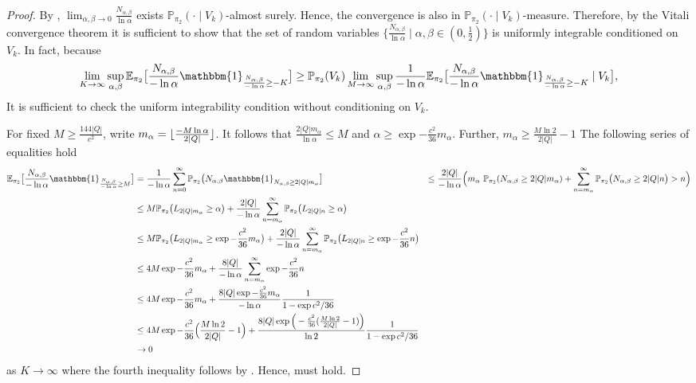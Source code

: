 \documentclass[a4paper,UKenglish,cleveref, autoref,mathscr]{lipics-v2019}
\newcommand{\EE}{\mathbb{E}}
\newcommand{\PP}{\mathbb{P}}
\newcommand{\1}{\mathbbm{1}}
\DeclarePairedDelimiter\floor{\lfloor}{\rfloor}
\begin{document}
\begin{proof}
By , $\lim_{\alpha, \beta \rightarrow 0} \frac{N_{\alpha, \beta}}{\ln \alpha}$ exists $\PP_{\pi_2}( \cdot \mid V_k)$-almost surely. Hence, the convergence is also in $\PP_{\pi_2}( \cdot \mid V_k)$-measure. Therefore, by the Vitali convergence theorem\cite{bog2007} it is sufficient to show that the set of random variables $\{ \frac{N_{\alpha, \beta}}{\ln \alpha} \mid \alpha, \beta \in (0,\frac12) \}$ is uniformly integrable conditioned on $V_k$. In fact, because
\begin{equation}\label{unifintcond}
\lim_{K \rightarrow \infty} \sup_{\alpha, \beta} \EE_{\pi_2} \big[ \frac{N_{\alpha, \beta}}{- \ln \alpha}\1_{\frac{N_{\alpha, \beta}}{-\ln \alpha} \geq - K}\big] \geq \PP_{\pi_2}(V_k) \lim_{M \rightarrow \infty} \sup_{\alpha, \beta} \frac{1}{- \ln \alpha}\EE_{\pi_2} \big[ \frac{N_{\alpha, \beta}}{- \ln \alpha}\1_{\frac{N_{\alpha, \beta}}{-\ln \alpha} \geq - K} \mid V_k \big],
\end{equation}
It is sufficient to check the uniform integrability condition without conditioning on $V_k$.

For fixed $M \geq \frac{144|Q|}{c^2}$, write $m_\alpha = \floor{\frac{- M \ln \alpha}{2|Q|}}$. It follows that $\frac{2|Q|m_\alpha}{\ln \alpha} \leq M$ and $\alpha \geq \exp{-\frac{c^2}{36} m_\alpha}$. Further, $m_\alpha \geq \frac{M \ln 2}{2|Q|} - 1$ The following series of equalities hold
\begin{align*}
 \EE_{\pi_2} \big[ \frac{N_{\alpha, \beta}}{- \ln \alpha} \1_{\frac{N_{\alpha, \beta}}{-\ln \alpha} \geq M}\big] & = \frac{1}{- \ln \alpha} \sum_{n = 0}^\infty \PP_{\pi_2} \big( N_{\alpha, \beta} \1_{N_{\alpha, \beta} \geq 2|Q|m_\alpha}\big] & \leq \frac{2|Q|}{- \ln \alpha}\Big( m_\alpha ~\PP_{\pi_2}(N_{\alpha, \beta} \geq 2|Q|m_\alpha) + \sum_{n = m_\alpha}^\infty \PP_{\pi_2}\big( N_{\alpha, \beta} \geq 2|Q|n\big) > n \Big)\\
& \leq M \PP_{\pi_2}\big( L_{2|Q|m_{\alpha}} \geq \alpha\big) + \frac{2|Q|}{- \ln \alpha} \sum_{n = m_\alpha}^\infty \PP_{\pi_2}\big( L_{2|Q|n} \geq \alpha\big) \\
& \leq M \PP_{\pi_2}\big( L_{2|Q|m_{\alpha}} \geq \exp{-\frac{c^2}{36} m_\alpha}\big) + \frac{2|Q|}{- \ln \alpha} \sum_{n = m_\alpha}^\infty \PP_{\pi_2}\big( L_{2|Q|n} \geq \exp{-\frac{c^2}{36} n}\big) \\
& \leq 4M \exp{-\frac{c^2}{36}m_\alpha}  + \frac{8|Q|}{- \ln \alpha} \sum_{n = m_\alpha}^\infty \exp{-\frac{c^2}{36} n}\\
& \leq 4M \exp{-\frac{c^2}{36}m_\alpha}  + \frac{8|Q|\exp{-\frac{c^2}{36} m_\alpha}}{- \ln \alpha} \frac{1}{1 - \exp{c^2 / 36}}\\
& \leq 4M \exp{-\frac{c^2}{36} \Big(\frac{M \ln 2}{2|Q|} - 1 \Big)}  + \frac{8|Q|\exp \Big( -\frac{c^2}{36} (\frac{M \ln 2}{2|Q|} - 1 ) \Big) }{\ln 2} \frac{1}{1 - \exp{c^2 / 36}}\\
& \rightarrow 0
\end{align*} 
as $K \rightarrow \infty$ where the fourth inequality follows by . Hence,  must hold. 
\end{proof}
 
\end{document}
